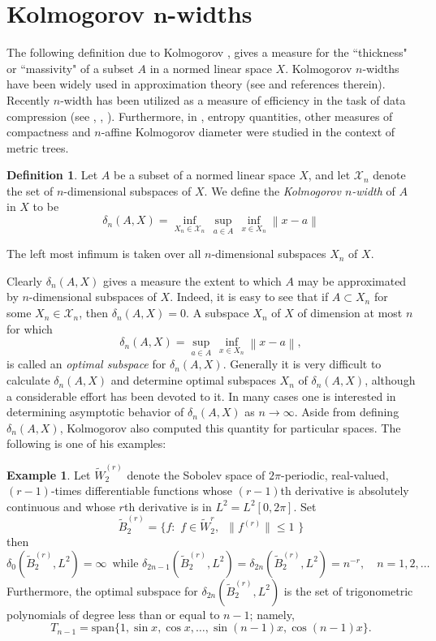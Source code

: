 \documentclass{bcp92}
\theoremstyle{plain}
\theoremstyle{definition}
\newtheorem{defi}[thm]{Definition}
\newtheorem{exm}[thm]{Example}
\begin{document}
\section{Kolmogorov $\boldsymbol n$-widths}
The following definition due to Kolmogorov \cite{Kolm}, gives a measure for
the ``thickness" or ``massivity" of a subset $A$ in a normed linear space
$X$. Kolmogorov $n$-widths have been widely used in approximation theory (see
\cite{Pink} and references therein). Recently $n$-width has been utilized as
a measure of efficiency in the task of data compression (see \cite{Dovd},
\cite{Posn}, \cite{Dono}). Furthermore, in \cite{AkTi},  entropy quantities,
other measures of compactness and $n$-affine Kolmogorov diameter were
studied in the context of metric trees.

\begin{defi}
Let $A$ be a subset of a normed linear space $X$, and let $\mathcal{X}_n$
denote the set of $n$-dimensional subspaces of $X$. We define the
\textit{Kolmogorov $n$-width} of $A$ in $X$ to be
$$
\delta_n(A,X) =
\inf_{X_n \in \mathcal{X}_n} \,\sup_{a \in A} \,\inf_{x \in X_n} \left\| x-a
\right\|
$$
\end{defi}

The left most infimum is taken over all $n$-dimensional subspaces $X_n$ of $X$.

Clearly $\delta_n(A,X)$ gives a measure the extent to which $A$  may be
approximated by $n$-dimensional subspaces of $X$. Indeed, it is easy to see
that if $A \subset X_n$ for some $X_n \in \mathcal{X}_n$, then $\delta_n(A,X)
= 0$. A subspace $X_n$ of $X$ of dimension at most $n$ for which
$$
\delta_n(A,X) = \sup_{a \in A} \,\inf_{x \in X_n} \left\| x-a \right\|,
$$
is called an \emph{optimal subspace} for $\delta_n(A,X)$. Generally it is
very difficult to calculate $\delta_n(A,X)$ and determine optimal subspaces
$X_n $ of $\delta_n(A,X)$, although a considerable effort has been devoted to
it. In many cases one is interested in determining asymptotic behavior of
$\delta_n(A,X)$ as $n \rightarrow \infty$. Aside from defining
$\delta_n(A,X)$, Kolmogorov  also computed this quantity for particular
spaces. The following is one of his examples:

\begin{exm}
Let $\tilde {W}_{2}^{(r)}$ denote the Sobolev space of $2 \pi$-periodic,
real-valued, $(r-1)$-times differentiable functions whose $(r-1)$th
derivative is absolutely continuous and whose $r$th derivative is in $L^2=
L^2[ 0, 2\pi]$. Set
$$
\tilde{B}_{2}^{(r)}= \{f:\,\, f\in \tilde
{W}_{2}^{r},\,\,\, \| f^{(r)}\| \leq 1 \,\,\}
$$
then
$$
\delta_0(\tilde{B}_{2}^{(r)}, L^2)= \infty \,\,\,\mbox{while} \,\, \delta_{2n-1}
(\tilde{B}_{2}^{(r)}, L^2)= \delta_{2n} (\tilde{B}_{2}^{(r)}, L^2)= n^{-r},
\quad n=1,2,\dots
$$
Furthermore, the optimal subspace for $\delta_{2n}
(\tilde{B}_{2}^{(r)}, L^2)$ is the set of trigonometric polynomials of degree
less than or equal to $n-1$; namely,
$$
T_{n-1} = \mbox{span} \{1,\sin x, \cos x, \dots , \sin(n-1)x, \cos(n-1)x \}.
$$
\end{exm}
\end{document}
